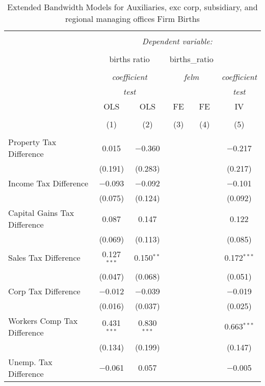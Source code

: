 
\begin{table}[!htbp] \centering 
  \caption{Extended Bandwidth Models for  Auxiliaries, exc corp, subsidiary, and regional managing offices Firm Births} 
  \label{} 
\begin{tabular}{@{\extracolsep{5pt}}lccccc} 
\\[-1.8ex]\hline 
\hline \\[-1.8ex] 
 & \multicolumn{5}{c}{\textit{Dependent variable:}} \\ 
\cline{2-6} 
\\[-1.8ex] & \multicolumn{2}{c}{births ratio} & \multicolumn{2}{c}{births\_ratio} &   \\ 
\\[-1.8ex] & \multicolumn{2}{c}{\textit{coefficient}} & \multicolumn{2}{c}{\textit{felm}} & \textit{coefficient} \\ 
 & \multicolumn{2}{c}{\textit{test}} & \multicolumn{2}{c}{\textit{}} & \textit{test} \\ 
 & OLS & OLS & FE & FE & IV \\ 
\\[-1.8ex] & (1) & (2) & (3) & (4) & (5)\\ 
\hline \\[-1.8ex] 
 Property Tax Difference & 0.015 & $-$0.360 &  &  & $-$0.217 \\ 
  & (0.191) & (0.283) &  &  & (0.217) \\ 
  Income Tax Difference & $-$0.093 & $-$0.092 &  &  & $-$0.101 \\ 
  & (0.075) & (0.124) &  &  & (0.092) \\ 
  Capital Gains Tax Difference & 0.087 & 0.147 &  &  & 0.122 \\ 
  & (0.069) & (0.113) &  &  & (0.085) \\ 
  Sales Tax Difference & 0.127$^{***}$ & 0.150$^{**}$ &  &  & 0.172$^{***}$ \\ 
  & (0.047) & (0.068) &  &  & (0.051) \\ 
  Corp Tax Difference & $-$0.012 & $-$0.039 &  &  & $-$0.019 \\ 
  & (0.016) & (0.037) &  &  & (0.025) \\ 
  Workers Comp Tax Difference & 0.431$^{***}$ & 0.830$^{***}$ &  &  & 0.663$^{***}$ \\ 
  & (0.134) & (0.199) &  &  & (0.147) \\ 
  Unemp. Tax Difference & $-$0.061 & 0.057 &  &  & $-$0.005 \\ 

\end{tabular}
\end{table}
